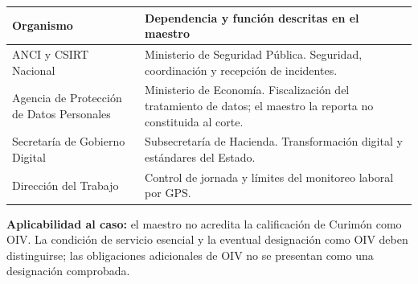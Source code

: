 {\def\LTcaptype{none} %
\begin{longtable}[]{@{}
  >{\raggedright\arraybackslash}p{}
  >{\raggedright\arraybackslash}p{}@{}}
\toprule\noalign{}
\begin{minipage}[b]{\linewidth}\raggedright
Organismo
\end{minipage} & \begin{minipage}[b]{\linewidth}\raggedright
Dependencia y función descritas en el maestro
\end{minipage} \\
\midrule\noalign{}
\endhead
\bottomrule\noalign{}
\endlastfoot
ANCI y CSIRT Nacional & Ministerio de Seguridad Pública. Seguridad, coordinación y recepción de incidentes. \\
Agencia de Protección de Datos Personales & Ministerio de Economía. Fiscalización del tratamiento de datos; el maestro la reporta no constituida al corte. \\
Secretaría de Gobierno Digital & Subsecretaría de Hacienda. Transformación digital y estándares del Estado. \\
Dirección del Trabajo & Control de jornada y límites del monitoreo laboral por GPS. \\
\end{longtable}
}

\textbf{Aplicabilidad al caso:} el maestro no acredita la calificación de Curimón como OIV. La condición de servicio esencial y la eventual designación como OIV deben distinguirse; las obligaciones adicionales de OIV no se presentan como una designación comprobada.
